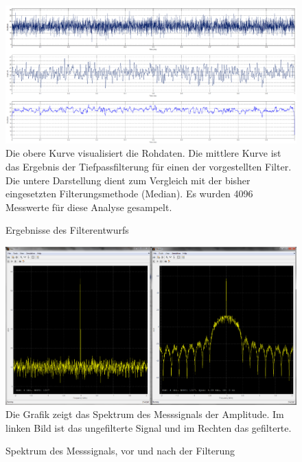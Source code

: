 \begin{figure} [h]
         \centering
         \caption{ Ergebnisse des Filterentwurfs }
         \label{fig:1}
         \centering
         \includegraphics[width=.8\textwidth]{common/img/AmpGefiltert_small.png}\\
\vspace{0.5cm}
Die obere Kurve visualisiert die Rohdaten. Die mittlere Kurve ist das Ergebnis der Tiefpassfilterung für einen der vorgestellten Filter. Die untere Darstellung dient zum Vergleich mit der bisher eingesetzten Filterungsmethode (Median). Es wurden 4096 Messwerte für diese Analyse gesampelt.
\end{figure}
\vspace{.5cm}
\begin{figure} [h]
         \centering
         \caption{ Spektrum des Messsignals, vor und nach der Filterung  }
         \label{fig:2}
	     \centering
	     \includegraphics[width=.6\textwidth]{common/img/SpektrumAmp.PNG} \\
\vspace{.2cm}
Die Grafik zeigt das Spektrum des Messsignals der Amplitude. Im linken Bild ist das ungefilterte Signal und im Rechten das gefilterte.
%
\end{figure}
\vspace{.5cm}
